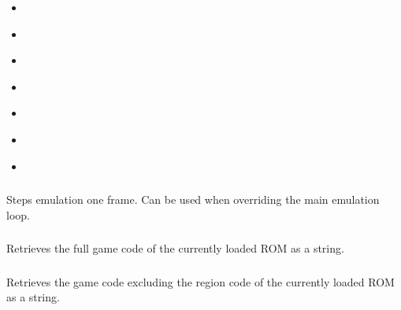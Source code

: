 \documentclass[letterpaper,10pt,english]{sphinxmanual}
\begin{document}
\begin{itemize}
\item {} 
\sphinxAtStartPar
{\hyperref[\detokenize{mods:openscript}]{}}

\item {} 
\sphinxAtStartPar
{\hyperref[\detokenize{mods:reset}]{}}

\item {} 
\sphinxAtStartPar
{\hyperref[\detokenize{mods:addmenu}]{}}

\item {} 
\sphinxAtStartPar
{\hyperref[\detokenize{mods:setmenuiteminfo}]{}}

\item {} 
\sphinxAtStartPar
{\hyperref[\detokenize{mods:registermenustart}]{}}

\item {} 
\sphinxAtStartPar
{\hyperref[\detokenize{mods:register3devent}]{}}

\item {} 
\sphinxAtStartPar
{\hyperref[\detokenize{mods:set3dtransform}]{}}

\end{itemize}


\subsubsection{}
\label{\detokenize{mods:emu-frameadvance}}\label{\detokenize{mods:frameadvance}}
\sphinxAtStartPar
Steps emulation one frame. Can be used when overriding the main emulation loop.


\subsubsection{}
\label{\detokenize{mods:emu-gamecode}}\label{\detokenize{mods:gamecode}}
\sphinxAtStartPar
Retrieves the full game code of the currently loaded ROM as a string.


\subsubsection{}
\label{\detokenize{mods:emu-smallgamecode}}\label{\detokenize{mods:smallgamecode}}
\sphinxAtStartPar
Retrieves the game code excluding the region code of the currently loaded ROM as a string.
\end{document}
